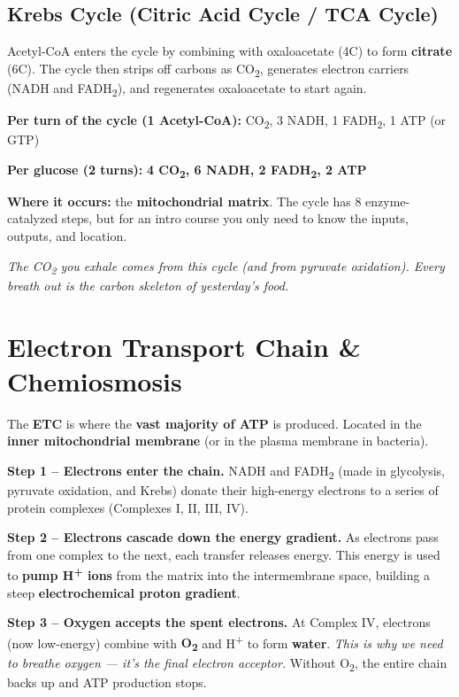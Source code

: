 \documentclass[11pt, letterpaper]{article}
\begin{document}
\subsection*{Krebs Cycle (Citric Acid Cycle / TCA Cycle)}

Acetyl-CoA enters the cycle by combining with oxaloacetate (4C) to form \textbf{citrate} (6C).
The cycle then strips off carbons as CO\textsubscript{2}, generates electron carriers
(NADH and FADH\textsubscript{2}), and regenerates oxaloacetate to start again.

\textbf{Per turn of the cycle (1 Acetyl-CoA):}  CO\textsubscript{2}, 3 NADH, 1 FADH\textsubscript{2}, 1 ATP (or GTP)

\textbf{Per glucose (2 turns):} \quad \textbf{4 CO\textsubscript{2}, 6 NADH, 2 FADH\textsubscript{2}, 2 ATP}

\textbf{Where it occurs:} the \textbf{mitochondrial matrix}. The cycle has 8 enzyme-catalyzed steps, but for an intro course you only need to know the inputs, outputs, and location.

\textit{The CO\textsubscript{2} you exhale comes from this cycle (and from pyruvate oxidation).
Every breath out is the carbon skeleton of yesterday's food.}

\section*{Electron Transport Chain \& Chemiosmosis}

The \textbf{ETC} is where the \textbf{vast majority of ATP} is produced. Located in the
\textbf{inner mitochondrial membrane} (or in the plasma membrane in bacteria).

\textbf{Step 1 -- Electrons enter the chain.} NADH and FADH\textsubscript{2} (made in
glycolysis, pyruvate oxidation, and Krebs) donate their high-energy electrons to a series
of protein complexes (Complexes I, II, III, IV).

\textbf{Step 2 -- Electrons cascade down the energy gradient.} As electrons pass from one
complex to the next, each transfer releases energy. This energy is used to \textbf{pump
H\textsuperscript{+} ions} from the matrix into the intermembrane space, building a steep
\textbf{electrochemical proton gradient}.

\textbf{Step 3 -- Oxygen accepts the spent electrons.} At Complex IV, electrons (now
low-energy) combine with \textbf{O\textsubscript{2}} and H\textsuperscript{+} to form
\textbf{water}. \emph{This is why we need to breathe oxygen --- it's the final electron
acceptor.} Without O\textsubscript{2}, the entire chain backs up and ATP production stops.
\end{document}
